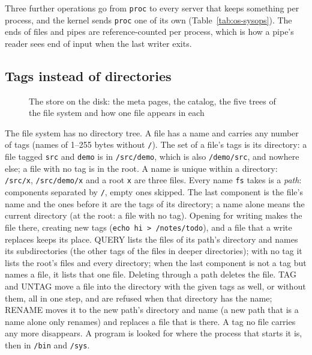 

Three further operations go from \texttt{proc} to every server that keeps something per process, and
the kernel sends \texttt{proc} one of its own (Table~\ref{tab:os-sysops}). The ends of files and pipes are
reference-counted per process, which is how a pipe's reader sees end of input when the last writer exits.



\subsection{Tags instead of directories}\label{sec:os-tags}

\begin{figure}[htbp]
\centering

\caption{The store on the disk: the meta pages, the catalog, the five trees of the file system and how one file appears in each}\label{fig:os-store}
\end{figure}

The file system has no directory tree. A file has a name and carries any number of tags (names of
1--255 bytes without \texttt{/}). The set of a file's tags is its directory: a file tagged
\texttt{src} and \texttt{demo} is in \texttt{/src/demo}, which is also \texttt{/demo/src}, and
nowhere else; a file with no tag is in the root. A name is unique within a directory:
\texttt{/src/x}, \texttt{/src/demo/x} and a root \texttt{x} are three files. Every name \texttt{fs}
takes is a \emph{path}: components separated by \texttt{/}, empty ones skipped. The last component
is the file's name and the ones before it are the tags of its directory; a name alone means the
current directory (at the root: a file with no tag). Opening for writing makes the file there,
creating new tags (\texttt{echo hi > /notes/todo}), and a file that a write replaces keeps its
place. QUERY lists the files of its path's directory and names its subdirectories (the other tags
of the files in deeper directories); with no tag it lists the root's files and every directory;
when the last component is not a tag but names a file, it lists that one file. Deleting through a
path deletes the file. TAG and UNTAG move a file into the directory with the given tags as well,
or without them, all in one step, and are refused when that directory has the name; RENAME moves
it to the new path's directory and name (a new path that is a name alone only renames) and
replaces a file that is there. A tag no file carries any more disappears. A program is looked for
where the process that starts it is, then in \texttt{/bin} and \texttt{/sys}.

